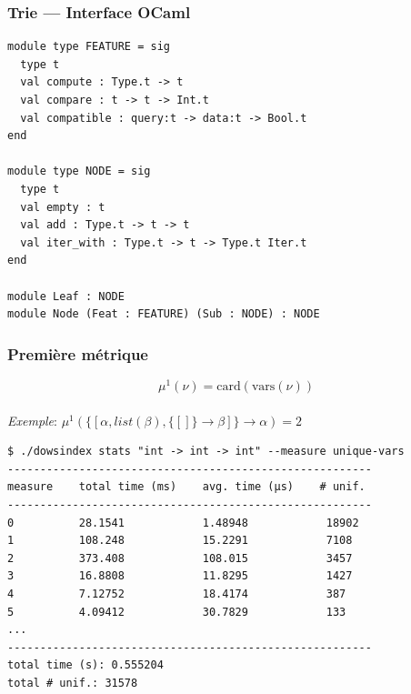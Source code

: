 \documentclass[serif]{beamer}
\newcommand{\exemple}{\textit{Exemple}\xspace}
\newcommand{\mset}[1]{\{\![#1]\!\}}
\begin{document}
\begin{frame}[fragile=singleslide]\frametitle{Trie — Interface OCaml}
\footnotesize
\begin{verbatim}
module type FEATURE = sig
  type t
  val compute : Type.t -> t
  val compare : t -> t -> Int.t
  val compatible : query:t -> data:t -> Bool.t
end

module type NODE = sig
  type t
  val empty : t
  val add : Type.t -> t -> t
  val iter_with : Type.t -> t -> Type.t Iter.t
end

module Leaf : NODE
module Node (Feat : FEATURE) (Sub : NODE) : NODE
\end{verbatim}
\end{frame}


\begin{frame}[fragile=singleslide]\frametitle{Première métrique}
\scriptsize
\[ \mu^1 (\nu) = \mathrm{card} (\mathrm{vars} (\nu)) \]
\\
\exemple : $\mu^1 (\mset{\alpha, list (\beta), \mset{} \rightarrow \beta} \rightarrow \alpha) = 2$
\\
\begin{verbatim}
$ ./dowsindex stats "int -> int -> int" --measure unique-vars
--------------------------------------------------------
measure    total time (ms)    avg. time (µs)    # unif.
--------------------------------------------------------
0          28.1541            1.48948            18902
1          108.248            15.2291            7108
2          373.408            108.015            3457
3          16.8808            11.8295            1427
4          7.12752            18.4174            387
5          4.09412            30.7829            133
...
--------------------------------------------------------
total time (s): 0.555204
total # unif.: 31578
\end{verbatim}
\end{frame}

\end{document}
